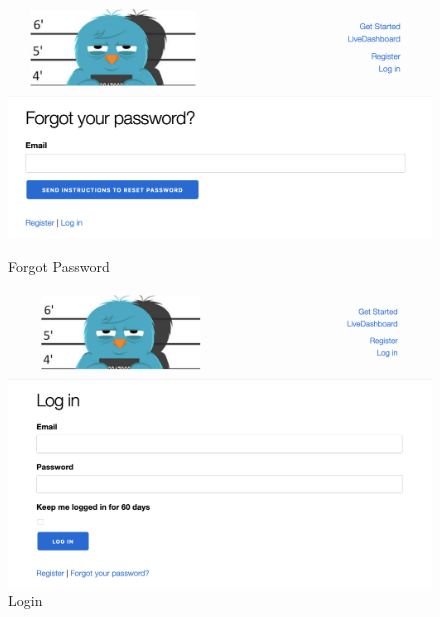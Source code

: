 \begin{figure}[htbp]
	\centering
	
	\begin{minipage}[b]{0.45\textwidth}
		\centering
		\includegraphics[width=\linewidth]{figures/FT_forgot_pw.png}
		\caption{Forgot Password}
		\label{fig:pw}
	\end{minipage}
	\hfill
	\begin{minipage}[b]{0.45\textwidth}
		\centering
		\includegraphics[width=\linewidth]{figures/FT_login.png}
		\caption{Login}
		\label{fig:login}
	\end{minipage}

\end{figure}

